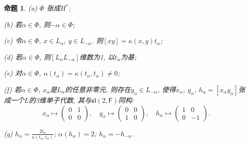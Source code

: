 \documentclass{ctexart}%
\newtheorem{proposition}{命题}
\theoremstyle{definition}
\theoremstyle{remark}
\begin{document}
\begin{proposition}\label{8.3}
(a) $\Phi$ 张成$H^*$; 

(b) 若$\alpha \in \Phi$, 则$-\alpha \in \Phi$; 

(c) 令$\alpha \in \Phi$, $x\in L_\alpha$, $y\in L_{-\alpha}$. 则$[xy]=\kappa(x,y)t_\alpha$; 

(d) 若$\alpha \in \Phi$, 则$[L_\alpha L_{-\alpha}]$维数为1, 以$t_\alpha$为基; 

(e) 对$\alpha \in \Phi$, $\alpha(t_\alpha)=\kappa(t_\alpha,t_\alpha)\neq 0$; 

(f) 若$\alpha \in \Phi$, $x_\alpha$是$L_\alpha$的任意非零元, 则存在$y_\alpha \in L_{-\alpha}$, 使得$x_\alpha$, $y_\alpha$, $h_\alpha=[x_\alpha y_\alpha]$张成一个$L$的3维单子代数, 其与$\mathfrak{sl}(2,\mathsf{F})$同构:
$$x_\alpha\mapsto\left(\begin{array}{cc}0 & 1\\0 & 0 \end{array}\right),\quad
y_\alpha\mapsto \left(\begin{array}{cc}0&0\\1&0\end{array}\right),\quad
h_\alpha\mapsto \left(\begin{array}{cc}1&0\\0&-1\end{array}\right).
$$

(g) $h_\alpha = \frac{2t_\alpha}{\kappa(t_\alpha,t_\alpha)}$; $\alpha(h_\alpha)=2$; $h_\alpha = - h_{-\alpha}$.
\end{proposition}
\end{document}
